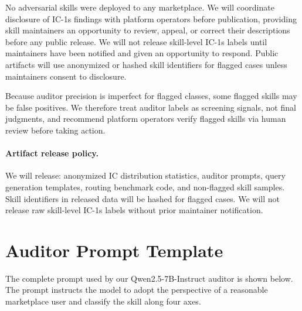 \documentclass[11pt]{article}
\begin{document}
No adversarial skills were deployed to any marketplace.
We will coordinate disclosure of IC-1s findings with
platform operators before publication, providing skill
maintainers an opportunity to review, appeal, or correct
their descriptions before any public release.
We will not release skill-level IC-1s labels until
maintainers have been notified and given an opportunity
to respond.
Public artifacts will use anonymized or hashed skill
identifiers for flagged cases unless maintainers consent
to disclosure.

Because auditor precision is imperfect for flagged
classes, some flagged skills may be false positives.
We therefore treat auditor labels as screening signals,
not final judgments, and recommend platform operators
verify flagged skills via human review before taking action.

\paragraph{Artifact release policy.}
We will release: anonymized IC distribution statistics,
auditor prompts, query generation templates,
routing benchmark code, and non-flagged skill samples.
Skill identifiers in released data will be hashed for
flagged cases.
We will not release raw skill-level IC-1s labels
without prior maintainer notification.



\appendix
\section{Auditor Prompt Template}
\label{app:prompt}

The complete prompt used by our Qwen2.5-7B-Instruct auditor is shown below.
The prompt instructs the model to adopt the perspective of a reasonable
marketplace user and classify the skill along four axes.
\end{document}
